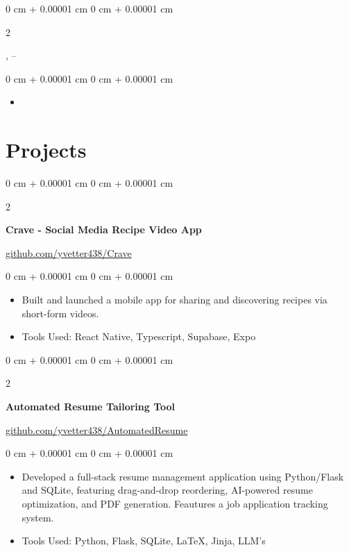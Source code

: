 \documentclass[10pt, letterpaper]{article}
\newenvironment{highlights}{
    \begin{itemize}[
        topsep=0.10 cm,
        parsep=0.10 cm,
        partopsep=0pt,
        itemsep=0pt,
        leftmargin=0 cm + 20pt
    ]
}{
    \end{itemize}
} %
\newenvironment{onecolentry}{
    \begin{adjustwidth}{
        0 cm + 0.00001 cm
    }{
        0 cm + 0.00001 cm
    }
}{
    \end{adjustwidth}
} %
\newenvironment{twocolentry}[2][]{
    \onecolentry
    \def\secondColumn{#2}
    \setcolumnwidth{\fill, 4.5 cm}
    \begin{paracol}{2}
}{
    \switchcolumn \raggedleft \secondColumn
    \end{paracol}
    \endonecolentry
} %
\begin{document}
    \vspace{0.2 cm}

    \begin{twocolentry}{
        \VAR{job4.dates}
    }
        \textbf{},  -- 
    \end{twocolentry}

    \vspace{0.10 cm}
    \begin{onecolentry}
        \begin{highlights}
            \item {}
        \end{highlights}
    \end{onecolentry}

    \section{Projects}

    \begin{twocolentry}{
        \href{https://github.com/yvetter438/Crave}{github.com/yvetter438/Crave}
    }
        \textbf{Crave - Social Media Recipe Video App}
    \end{twocolentry}

    \vspace{0.10 cm}
    \begin{onecolentry}
        \begin{highlights}
            \item Built and launched a mobile app for sharing and discovering recipes via short-form videos.
            \item Tools Used: React Native, Typescript, Supabase, Expo
        \end{highlights}
    \end{onecolentry}

    \vspace{0.2 cm}

    \begin{twocolentry}{
        \href{https://github.com/yvetter438/AutomatedResume}{github.com/yvetter438/AutomatedResume}
    }
        \textbf{Automated Resume Tailoring Tool}
    \end{twocolentry}

    \vspace{0.10 cm}
    \begin{onecolentry}
        \begin{highlights}
            \item Developed a full-stack resume management application using Python/Flask and SQLite, featuring drag-and-drop reordering, AI-powered resume optimization, and PDF generation. Feautures a job application tracking system.
            \item Tools Used: Python, Flask, SQLite, LaTeX, Jinja, LLM's
        \end{highlights}
    \end{onecolentry}
\end{document}
